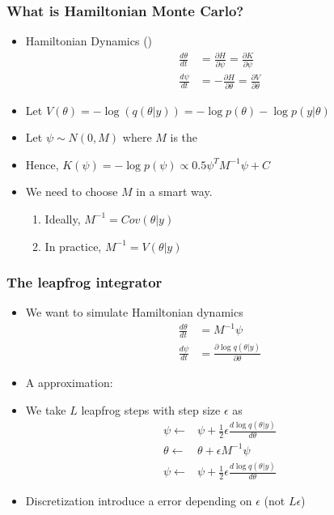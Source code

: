 \documentclass[10pt]{beamer}
\begin{document}
\begin{frame}
\frametitle{What is Hamiltonian Monte Carlo?}

\begin{itemize}
\item Hamiltonian Dynamics ()
\begin{align}
\frac{d\theta}{dt} &=  \frac{\partial H}{\partial \psi} = \frac{\partial K}{\partial \psi}\\
\frac{d\psi}{dt} &=  - \frac{\partial H}{\partial \theta} = \frac{\partial V}{\partial \theta}
\end{align}
\item Let $V(\theta) = - \log(q(\theta|y))= - \log p(\theta) - \log p(y | \theta)$
\item Let $\psi \sim N(0, M)$ where $M$ is the 
\item Hence, $K(\psi) = - \log p(\psi) \propto 0.5 \psi^T M^{-1} \psi + C$
\pause
\item We need to choose $M$ in a smart way.
\begin{enumerate}
\item Ideally, $M^{-1}=Cov(\theta|y)$
\item In practice, $M^{-1}=V(\theta|y)$
\end{enumerate}
\end{itemize}
\end{frame}


\begin{frame}

\frametitle{The leapfrog integrator}

\begin{itemize}
\item We want to simulate Hamiltonian dynamics
\begin{align}
\frac{d\theta}{dt} &=  M^{-1} \psi\\
\frac{d\psi}{dt} &=  \frac{\partial \log q(\theta|y)}{\partial \theta}
\end{align}
\item A  approximation: 
\pause
\item We take $L$ leapfrog steps with step size $\epsilon$ as
\begin{align}
\psi \leftarrow &\psi + \frac{1}{2}\epsilon \frac{d\log q(\theta|y)}{d\theta}\\
\theta \leftarrow& \theta + \epsilon M^{-1}\psi\\
\psi \leftarrow &\psi + \frac{1}{2}\epsilon \frac{d\log q(\theta|y)}{d\theta}
\end{align}
\pause
\item Discretization introduce a error depending on $\epsilon$ (not $L \epsilon$)
\end{itemize}
\end{frame}
\end{document}

